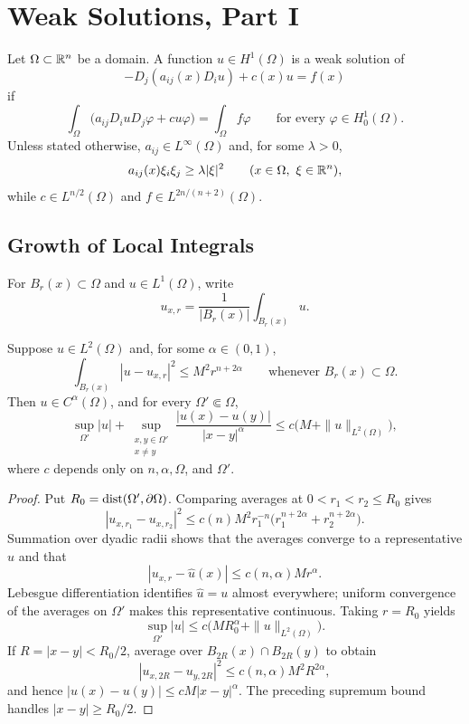 \chapter{Weak Solutions, Part I}

Let $\Omega\subset\mathbb{R}^n$ be a domain. A function $u\in H^1(\Omega)$ is a weak
solution of
\[
-D_j(a_{ij}(x)D_i u)+c(x)u=f(x)
\]
if
\[
\int_\Omega \bigl(a_{ij}D_i uD_j\varphi+cu\varphi\bigr)
=\int_\Omega f\varphi
\qquad\text{for every }\varphi\in H^1_0(\Omega).
\]
Unless stated otherwise, $a_{ij}\in L^\infty(\Omega)$ and, for some
$\lambda>0$,
\[
a_{ij}(x)\xi_i\xi_j\geq\lambda|\xi|^2
\qquad(x\in\Omega,\ \xi\in\mathbb{R}^n),
\]
while $c\in L^{n/2}(\Omega)$ and
$f\in L^{2n/(n+2)}(\Omega)$.

\section{Growth of Local Integrals}

For $B_r(x)\subset\Omega$ and $u\in L^1(\Omega)$, write
\[
u_{x,r}=\frac{1}{|B_r(x)|}\int_{B_r(x)}u.
\]

\begin{theorem}\label{hanlin:weaksol-part1-campanato}
Suppose $u\in L^2(\Omega)$ and, for some $\alpha\in(0,1)$,
\[
\int_{B_r(x)}|u-u_{x,r}|^2\leq M^2r^{n+2\alpha}
\qquad\text{whenever }B_r(x)\subset\Omega.
\]
Then $u\in C^\alpha(\Omega)$, and for every $\Omega'\Subset\Omega$,
\[
\sup_{\Omega'}|u|+
\sup_{\substack{x,y\in\Omega'\\x\ne y}}
\frac{|u(x)-u(y)|}{|x-y|^\alpha}
\leq c\bigl(M+\|u\|_{L^2(\Omega)}\bigr),
\]
where $c$ depends only on $n,\alpha,\Omega$, and $\Omega'$.
\end{theorem}
\begin{proof}
\sketch Put $R_0=\operatorname{dist}(\Omega',\partial\Omega)$. Comparing averages at
$0<r_1<r_2\leq R_0$ gives
\[
|u_{x,r_1}-u_{x,r_2}|^2
\leq c(n)M^2r_1^{-n}
\bigl(r_1^{n+2\alpha}+r_2^{n+2\alpha}\bigr).
\]
Summation over dyadic radii shows that the averages converge to a representative
$\widehat u$ and that
\[
|u_{x,r}-\widehat u(x)|\leq c(n,\alpha)Mr^\alpha.
\]
Lebesgue differentiation identifies $\widehat u=u$ almost everywhere; uniform
convergence of the averages on $\Omega'$ makes this representative continuous.
Taking $r=R_0$ yields
\[
\sup_{\Omega'}|u|
\leq c\bigl(MR_0^\alpha+\|u\|_{L^2(\Omega)}\bigr).
\]
If $R=|x-y|<R_0/2$, average over
$B_{2R}(x)\cap B_{2R}(y)$ to obtain
\[
|u_{x,2R}-u_{y,2R}|^2\leq c(n,\alpha)M^2R^{2\alpha},
\]
and hence $|u(x)-u(y)|\leq cM|x-y|^\alpha$. The preceding supremum
bound handles $|x-y|\geq R_0/2$.
\end{proof}

